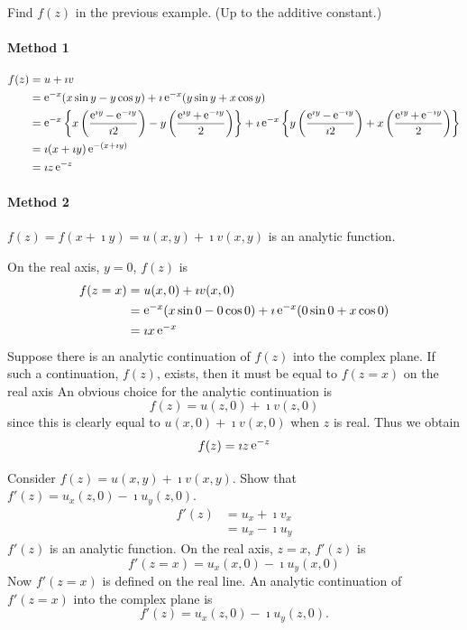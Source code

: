 \begin{Example}
  Find $f(z)$ in the previous example.  (Up to the additive constant.)

  \paragraph{Method 1}
  \begin{align*}
    f(z) &= u + \imath v 
    \\
    &= \mathop{\mathrm{e}}\nolimits^{-x} (x \sin y - y \cos y) + \imath \mathop{\mathrm{e}}\nolimits^{-x} (y \sin y + x \cos y) 
    \\
    &= \mathop{\mathrm{e}}\nolimits^{-x} \left\{ x \left( \frac{\mathop{\mathrm{e}}\nolimits^{\imath y} - \mathop{\mathrm{e}}\nolimits^{-\imath y}}{\imath 2} \right)
      - y \left( \frac{\mathop{\mathrm{e}}\nolimits^{\imath y} + \mathop{\mathrm{e}}\nolimits^{-\imath y}}{2} \right) \right\} +
    \imath \mathop{\mathrm{e}}\nolimits^{-x} \left\{ y \left(\frac{\mathop{\mathrm{e}}\nolimits^{\imath y}-\mathop{\mathrm{e}}\nolimits^{-\imath y}}{\imath 2} \right) +
      x \left( \frac{\mathop{\mathrm{e}}\nolimits^{\imath y} + \mathop{\mathrm{e}}\nolimits^{-\imath y}}{2} \right) \right\} 
    \\
    &= \imath (x + \imath y) \mathop{\mathrm{e}}\nolimits^{-(x + \imath y)} 
    \\
    &= \imath z \mathop{\mathrm{e}}\nolimits^{-z}
  \end{align*}

  \paragraph{Method 2}
  $f(z) = f(x + \imath y) = u(x,y) + \imath v(x,y)$ is an analytic function.

  On the real axis, $y = 0$, $f(z)$ is
  \begin{align*}
    f(z = x) &= u(x,0) + \imath v(x,0) 
    \\
    &= \mathop{\mathrm{e}}\nolimits^{-x} (x \sin 0 - 0 \cos 0) + \imath \mathop{\mathrm{e}}\nolimits^{-x} (0 \sin 0 + x \cos 0) 
    \\
    &= \imath x \mathop{\mathrm{e}}\nolimits^{-x}
  \end{align*}
  Suppose there is an analytic continuation of $f(z)$ into the complex plane.
  If such a continuation, $f(z)$, exists, then it must be equal to $f(z = x)$
  on the real axis
  An obvious choice for the analytic continuation is
  \[
  f(z) = u(z, 0) + \imath v(z, 0)
  \]
  since this is clearly equal to $u(x, 0) + \imath v(x, 0)$ when $z$ is real.
  Thus we obtain
  \[  
  f(z) = \imath z \mathop{\mathrm{e}}\nolimits^{-z} 
  \]
\end{Example}




\begin{Example}
  Consider $f(z) = u(x, y) + \imath v(x, y)$.
  Show that
  $f'(z) = u_x(z,0) - \imath u_y(z,0)$.
  \begin{align*}
    f'(z) &= u_x + \imath v_x 
    \\
    &= u_x - \imath u_y
  \end{align*}
  $f'(z)$ is an analytic function.  On the real axis, $z = x$, $f'(z)$ is
  \[
  f'(z = x) = u_x(x,0) - \imath u_y(x,0)
  \]
  Now $f'(z = x)$ is defined on the real line.  An analytic continuation of
  $f'(z = x)$ into the complex plane is
  \[
  \boxed{ 
    f'(z) = u_x(z, 0) - \imath u_y(z, 0). 
    }
  \]
\end{Example}









